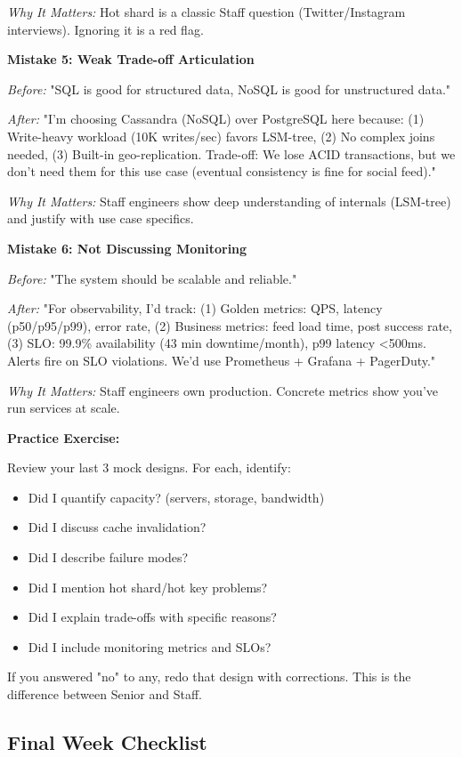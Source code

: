 \documentclass[10pt]{article}
\begin{document}
\textit{Why It Matters:} Hot shard is a classic Staff question (Twitter/Instagram interviews). Ignoring it is a red flag.

\textbf{Mistake 5: Weak Trade-off Articulation}

\textit{Before:} "SQL is good for structured data, NoSQL is good for unstructured data."

\textit{After:} "I'm choosing Cassandra (NoSQL) over PostgreSQL here because: (1) Write-heavy workload (10K writes/sec) favors LSM-tree, (2) No complex joins needed, (3) Built-in geo-replication. Trade-off: We lose ACID transactions, but we don't need them for this use case (eventual consistency is fine for social feed)."

\textit{Why It Matters:} Staff engineers show deep understanding of internals (LSM-tree) and justify with use case specifics.

\textbf{Mistake 6: Not Discussing Monitoring}

\textit{Before:} "The system should be scalable and reliable."

\textit{After:} "For observability, I'd track: (1) Golden metrics: QPS, latency (p50/p95/p99), error rate, (2) Business metrics: feed load time, post success rate, (3) SLO: 99.9\% availability (43 min downtime/month), p99 latency <500ms. Alerts fire on SLO violations. We'd use Prometheus + Grafana + PagerDuty."

\textit{Why It Matters:} Staff engineers own production. Concrete metrics show you've run services at scale.

\textbf{Practice Exercise:}

Review your last 3 mock designs. For each, identify:
\begin{itemize}
\item Did I quantify capacity? (servers, storage, bandwidth)
\item Did I discuss cache invalidation?
\item Did I describe failure modes?
\item Did I mention hot shard/hot key problems?
\item Did I explain trade-offs with specific reasons?
\item Did I include monitoring metrics and SLOs?
\end{itemize}

If you answered "no" to any, redo that design with corrections. This is the difference between Senior and Staff.

\subsection{Final Week Checklist}
\end{document}
